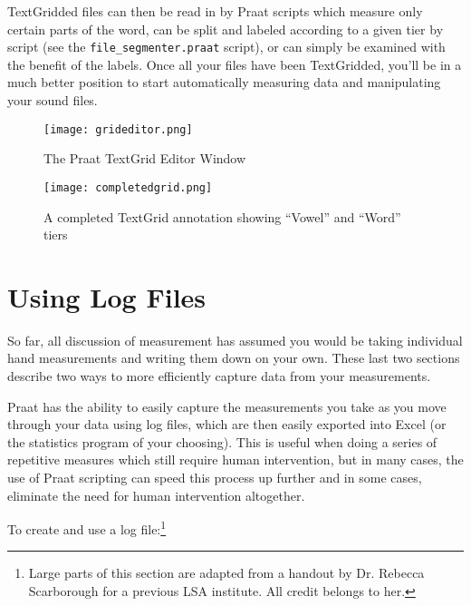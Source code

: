 TextGridded files can then be read in by Praat scripts which measure
only certain parts of the word, can be split and labeled according to a
given tier by script (see the \texttt{file\_segmenter.praat} script), or
can simply be examined with the benefit of the labels. Once all your
files have been TextGridded, you'll be in a much better position to
start automatically measuring data and manipulating your sound files.

\begin{figure}
  \centerline{
    \mbox{\texttt{[image: grideditor.png]}}
  }
    \caption{The Praat TextGrid Editor Window \label{grideditor}}
  
  \end{figure}

\begin{figure}
  \centerline{
    \mbox{\texttt{[image: completedgrid.png]}}
  }
    \caption{A completed TextGrid annotation showing “Vowel” and “Word” tiers\label{completedgrid}}
  
  \end{figure}

\hypertarget{using-log-files}{%
\section{Using Log Files}\label{using-log-files}}

So far, all discussion of measurement has assumed you would be taking
individual hand measurements and writing them down on your own. These
last two sections describe two ways to more efficiently capture data
from your measurements.

Praat has the ability to easily capture the measurements you take as you
move through your data using log files, which are then easily exported
into Excel (or the statistics program of your choosing). This is useful
when doing a series of repetitive measures which still require human
intervention, but in many cases, the use of Praat scripting can speed
this process up further and in some cases, eliminate the need for human
intervention altogether.

To create and use a log
file:\footnote{Large parts of this section are adapted from a handout by Dr. Rebecca Scarborough for a previous LSA institute.  All credit belongs to her.}

